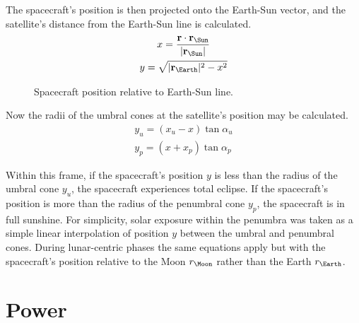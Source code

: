 The spacecraft's position is then projected onto the Earth-Sun vector, and the satellite's distance from the Earth-Sun line is calculated.
\begin{subequations}
\begin{gather}
x = \frac{\vec{r}\cdot\vec{r_\Sun}}{|\vec{r_\Sun}|} \\
y = \sqrt{|\vec{r_\Earth}|^2-x^2} 
\end{gather}
\end{subequations}

\begin{figure}
\caption{Spacecraft position relative to Earth-Sun line.} \label{fig:Spacecraft-shadow}
\centering
\def\svgwidth{\figurewidth}
\end{figure}

Now the radii of the umbral cones at the satellite's position may be calculated.
\begin{subequations}
\begin{gather}
y_u = (x_u-x)\tan\alpha_u \\
y_p = (x+x_p)\tan\alpha_p
\end{gather}
\end{subequations}

Within this frame, if the spacecraft's position $y$ is less than the radius of the umbral cone $y_u$, the spacecraft experiences total eclipse. If the spacecraft's position is more than the radius of the penumbral cone $y_p$, the spacecraft is in full sunshine. For simplicity, solar exposure within the penumbra was taken as a simple linear interpolation of position $y$ between the umbral and penumbral cones. During lunar-centric phases the same equations apply but with the spacecraft's position relative to the Moon $r_\Moon$ rather than the Earth $r_\Earth$.


\section{Power}\label{sec:Vehicle-power}

